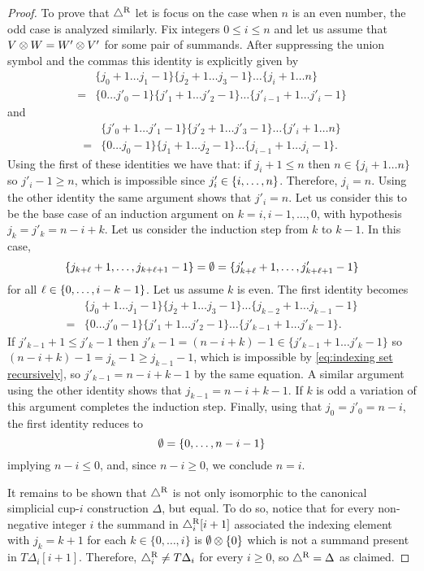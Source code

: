 \begin{proof}
	To prove that $\triangle^{\mathrm{R}}$ let is focus on the case when $n$ is an even number, the odd case is analyzed similarly.
	Fix integers $0 \leq i \leq n$ and let us assume that $V \otimes W = W' \otimes V'$ for some pair of summands.
	After suppressing the union symbol and the commas this identity is explicitly given by
	\begin{align*}
		&\{j_0+1 \dots j_1-1\} \{j_2+1 \dots j_3-1\} \dots \{j_i+1 \dots n\} \\=
		&\{0 \dots j'_0-1\} \{j'_1+1 \dots j'_2-1\} \dots \{j'_{i-1}+1 \dots j'_i-1\}
	\end{align*}
	and
	\begin{align*}
		&\{j'_0+1 \dots j'_1-1\} \{j'_2+1 \dots j'_3-1\} \dots \{j'_i+1 \dots n\} \\=
		&\{0 \dots j_0-1\} \{j_1+1 \dots j_2-1\} \dots \{j_{i-1}+1 \dots j_i-1\}.
	\end{align*}
	Using the first of these identities we have that: if $j_i+1 \leq n$ then $n \in \{j_i+1 \dots n\}$ so $j'_i-1 \geq n$, which is impossible since $j'_i \in \{i,\dots,n\}$.
	Therefore, $j_i = n$.
	Using the other identity the same argument shows that $j'_i = n$.
	Let us consider this to be the base case of an induction argument on $k = i,i-1,\dots,0$, with hypothesis $j_k = j'_k = n-i+k$.
	Let us consider the induction step from $k$ to $k-1$.
	In this case,
	\[
	\{j_{k+\ell}+1,\dots,j_{k+\ell+1}-1\} = \emptyset = \{j'_{k+\ell}+1,\dots,j'_{k+\ell+1}-1\}
	\]
	for all $\ell \in \{0,\dots,i-k-1\}$.
	Let us assume $k$ is even.
	The first identity becomes
	\begin{align*}
		&\{j_0+1 \dots j_1-1\} \{j_2+1 \dots j_3-1\} \dots \{j_{k-2}+1 \dots j_{k-1}-1\} \\=
		&\{0 \dots j'_0-1\} \{j'_1+1 \dots j'_2-1\} \dots \{j'_{k-1}+1 \dots j'_k-1\}.
	\end{align*}
	If $j'_{k-1}+1 \leq j'_k-1$ then $j'_k - 1 = (n-i+k) - 1 \in \{j'_{k-1}+1 \dots j'_k-1\}$ so $(n-i+k)-1 = j_k - 1 \geq j_{k-1}-1$, which is impossible by \cref{eq:indexing set recursively}, so $j'_{k-1} = n-i+k-1$ by the same equation.
	A similar argument using the other identity shows that $j_{k-1} = n-i+k-1$.
	If $k$ is odd a variation of this argument completes the induction step.
	Finally, using that $j_0 = j'_0 = n-i$, the first identity reduces to
	\[
	\emptyset = \{0,\dots, n-i-1\}
	\]
	implying $n-i \leq 0$, and, since $n-i \geq 0$, we conclude $n=i$.

	It remains to be shown that $\triangle^{\mathrm{R}}$ is not only isomorphic to the canonical simplicial \mbox{cup-$i$} construction $\Delta$, but equal.
	To do so, notice that for every non-negative integer $i$ the summand in $\triangle_i^{\mathrm{R}}[i+1]$ associated the indexing element with $j_k = k+1$ for each $k \in \{0,\dots,i\}$ is $\emptyset \otimes \{0\}$ which is not a summand present in $T \Delta_i[i+1]$.
	Therefore, $\triangle_i^{\mathrm{R}} \neq T \Delta_i$ for every $i \geq 0$, so $\triangle^{\mathrm{R}} = \Delta$ as claimed.
\end{proof}
